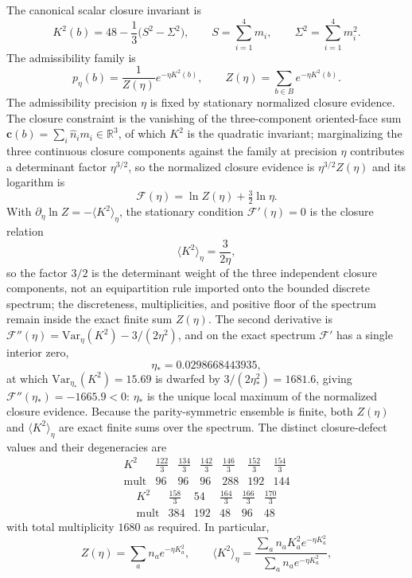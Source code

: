 \documentclass[11pt]{article}
\begin{document}
The canonical scalar closure invariant is
\[
K^2(b)=48-\frac{1}{3}\bigl(S^2-\Sigma^2\bigr),
\qquad
S=\sum_{i=1}^4 m_i,
\qquad
\Sigma^2=\sum_{i=1}^4 m_i^2.
\]
The admissibility family is
\[
p_\eta(b)=\frac{1}{Z(\eta)}e^{-\eta K^2(b)},
\qquad
Z(\eta)=\sum_{b\in B}e^{-\eta K^2(b)}.
\]
The admissibility precision $\eta$ is fixed by stationary normalized closure evidence. The closure constraint is the vanishing of the three-component oriented-face sum $\mathbf c(b)=\sum_i\hat n_i m_i\in\mathbb R^3$, of which $K^2$ is the quadratic invariant; marginalizing the three continuous closure components against the family at precision $\eta$ contributes a determinant factor $\eta^{3/2}$, so the normalized closure evidence is $\eta^{3/2}Z(\eta)$ and its logarithm is
\[
\mathcal F(\eta)=\ln Z(\eta)+\tfrac32\ln\eta.
\]
With $\partial_\eta\ln Z=-\langle K^2\rangle_\eta$, the stationary condition $\mathcal F'(\eta)=0$ is the closure relation
\[
\langle K^2\rangle_\eta=\frac{3}{2\eta},
\]
so the factor $3/2$ is the determinant weight of the three independent closure components, not an equipartition rule imported onto the bounded discrete spectrum; the discreteness, multiplicities, and positive floor of the spectrum remain inside the exact finite sum $Z(\eta)$. The second derivative is $\mathcal F''(\eta)=\mathrm{Var}_\eta(K^2)-3/(2\eta^2)$, and on the exact spectrum $\mathcal F'$ has a single interior zero,
\[
\eta_*=0.0298668443935,
\]
at which $\mathrm{Var}_{\eta_*}(K^2)=15.69$ is dwarfed by $3/(2\eta_*^2)=1681.6$, giving $\mathcal F''(\eta_*)=-1665.9<0$: $\eta_*$ is the unique local maximum of the normalized closure evidence.
Because the parity-symmetric ensemble is finite, both $Z(\eta)$ and $\langle K^2\rangle_\eta$ are exact finite sums over the spectrum. The distinct closure-defect values and their degeneracies are
\[
\begin{array}{c|cccccc}
K^2 &
\frac{122}{3} & \frac{134}{3} & \frac{142}{3} & \frac{146}{3} & \frac{152}{3} & \frac{154}{3} \\ \hline
\mathrm{mult} &
96 & 96 & 96 & 288 & 192 & 144
\end{array}
\]
\[
\begin{array}{c|ccccc}
K^2 &
\frac{158}{3} & 54 & \frac{164}{3} & \frac{166}{3} & \frac{170}{3} \\ \hline
\mathrm{mult} &
384 & 192 & 48 & 96 & 48
\end{array}
\]
with total multiplicity $1680$ as required. In particular,
\[
Z(\eta)=\sum_a n_a e^{-\eta K_a^2},
\qquad
\langle K^2\rangle_\eta=\frac{\sum_a n_a K_a^2 e^{-\eta K_a^2}}{\sum_a n_a e^{-\eta K_a^2}},
\]
\end{document}
